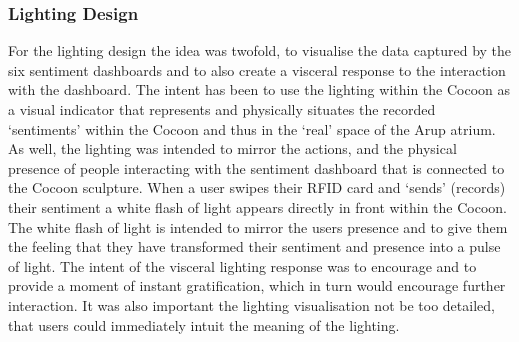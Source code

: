 \subsubsection{Lighting Design}

For the lighting design the idea was twofold, to visualise the data captured by the six sentiment dashboards and to also create a visceral response to the interaction with the dashboard. The intent has been to use the lighting within the Cocoon as a visual indicator that represents and physically situates the recorded ‘sentiments’ within the Cocoon and thus in the ‘real’ space of the Arup atrium. As well, the lighting was intended to mirror the actions, and the physical presence of people interacting with the sentiment dashboard that is connected to the Cocoon sculpture. When a user swipes their RFID card and ‘sends’ (records) their sentiment a white flash of light appears directly in front within the Cocoon. The white flash of light is intended to mirror the users presence and to give them the feeling that they have transformed their sentiment and presence into a pulse of light. The intent of the visceral lighting response was to encourage and to provide a moment of instant gratification, which in turn would encourage further interaction. It was also important the lighting visualisation not be too detailed, that users could immediately intuit the meaning of the lighting.

